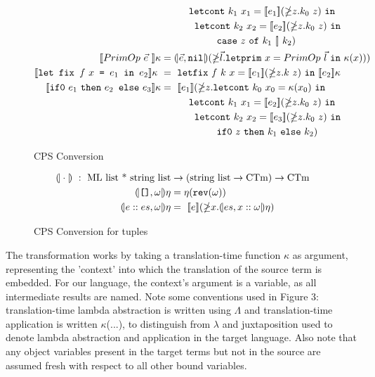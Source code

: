 \documentclass{article}
\theoremstyle{definition}
\theoremstyle{remark}
\numberwithin{equation}{section}
\begin{document}
\begin{figure}[!ht]
\begin{align*}
         &\kern1cm   \texttt{letcont}\ k_1\ x_1=
            [\![e_1]\!](\mathbb{\Lambda}z.k_0\ z)\ \texttt{in}\\
     &\kern1.2cm \texttt{letcont}\ k_2\ x_2=[\![e_2]\!]
        (\mathbb{\Lambda}z.k_0\ z)\ \texttt{in}\\
     &\kern2cm    \texttt{case}\ z\ \texttt{of}\ k_1\ [\!]\ k_2)\\    %
     \env{PrimOp\ \vec{e}\ }
       &=\round{\vec{e}, \texttt{nil}}(\mathbb{\Lambda}\vec{l}.   \texttt{letprim}
       \ x=PrimOp\ \vec{l}\ \texttt{in}\ \kappa (x)))\\  %
   \env{\texttt{let fix }f\ x\texttt{ = }e_1 \texttt{ in }e_2}\  &=
   \ \texttt{letfix}\ f\ k\ x=[\![e_1]\!]
    (\mathbb{\Lambda}z.k\ z)\ \texttt{in}\ \env{e_2}\\     %
    \kern-1.2cm [\![\texttt{if0}\ e_1\ \texttt{then}\ e_2
        \texttt{ else}\ e_3]\!]\kappa
     &=\ [\![e_1]\!](\mathbb{\Lambda}z.\texttt{letcont}\ k_0\ x_0=
            \kappa (x_0)\ \texttt{in}\\
         &\kern1cm   \texttt{letcont}\ k_1\ x_1=
            [\![e_2]\!](\mathbb{\Lambda}z.k_0\ z)\ \texttt{in}\\
     &\kern1.2cm     \texttt{letcont}\ k_2\ x_2=[\![e_3]\!]
        (\mathbb{\Lambda}z.k_0\ z)\ \texttt{in}\\
     &\kern2cm    \texttt{if0}\ z\ \texttt{then}\ k_1\ \texttt{else}\ k_2)    %
\end{align*}
  \caption{CPS Conversion}
  \label{fig-sub}
\end{figure}

\begin{figure}[!ht]
  \centering
\begin{align*}
    \round{\cdot}\ :\ \textrm{ML list * string list}&\to(\textrm{string list}\to
     \textrm{CTm})\to \textrm{CTm}\\     %
     \round{\texttt{[]}, \omega}\eta
        &=\eta (\texttt{rev} (\omega))\\   %
     \round{e::es, \omega}\eta
       &=\  [\![e]\!](\mathbb{\Lambda}x.
          \round{es,x::\omega}\eta )     %
\end{align*}

  \caption{CPS Conversion for tuples}
  \label{fig-sub}
\end{figure}

The transformation works by taking a translation-time function
$\kappa$ as argument, representing the 'context' into which the translation
of the source term is embedded. For our language, the context's
argument is a variable, as all intermediate results are named.
Note some conventions used in Figure 3: translation-time lambda abstraction
is written using $\mathbb{\Lambda}$ and translation-time application is
written $\kappa$(...), to distinguish from $\lambda$ and juxtaposition
 used to denote lambda abstraction and application in the target language.
 Also note that any object variables present in the target terms but not in
the source are assumed fresh with respect to all other bound variables.
\end{document}
